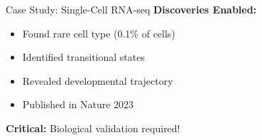 \documentclass[10pt]{beamer}
\newcommand{\warningbox}[1]{\colorbox{red!10}{\begin{minipage}{0.85\textwidth}\centering #1\end{minipage}}}
\begin{document}
\begin{frame}{Case Study: Single-Cell RNA-seq}
\vspace{0.3cm}
\textbf{Discoveries Enabled:}
\begin{itemize}
\footnotesize
\item Found rare cell type (0.1\% of cells)
\item Identified transitional states
\item Revealed developmental trajectory
\item Published in Nature 2023
\end{itemize}

\begin{center}
\warningbox{\footnotesize\textbf{Critical:} Biological validation required!}
\end{center}
\end{frame}

\end{document}
